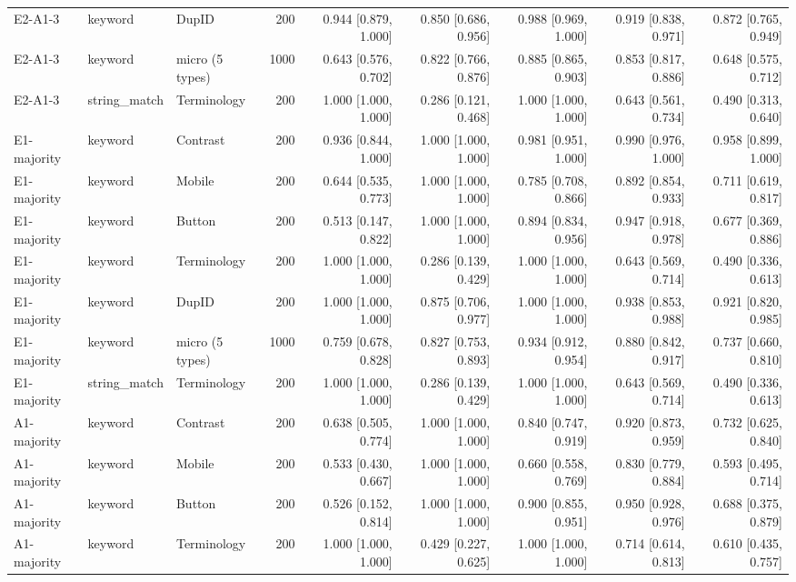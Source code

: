 \begin{table}[t]
\begin{tabular}{lllrrrrrr}
E2-A1-3 & keyword & DupID & 200 & 0.944 [0.879, 1.000] & 0.850 [0.686, 0.956] & 0.988 [0.969, 1.000] & 0.919 [0.838, 0.971] & 0.872 [0.765, 0.949] \\
E2-A1-3 & keyword & micro (5 types) & 1000 & 0.643 [0.576, 0.702] & 0.822 [0.766, 0.876] & 0.885 [0.865, 0.903] & 0.853 [0.817, 0.886] & 0.648 [0.575, 0.712] \\
E2-A1-3 & string\_match & Terminology & 200 & 1.000 [1.000, 1.000] & 0.286 [0.121, 0.468] & 1.000 [1.000, 1.000] & 0.643 [0.561, 0.734] & 0.490 [0.313, 0.640] \\
E1-majority & keyword & Contrast & 200 & 0.936 [0.844, 1.000] & 1.000 [1.000, 1.000] & 0.981 [0.951, 1.000] & 0.990 [0.976, 1.000] & 0.958 [0.899, 1.000] \\
E1-majority & keyword & Mobile & 200 & 0.644 [0.535, 0.773] & 1.000 [1.000, 1.000] & 0.785 [0.708, 0.866] & 0.892 [0.854, 0.933] & 0.711 [0.619, 0.817] \\
E1-majority & keyword & Button & 200 & 0.513 [0.147, 0.822] & 1.000 [1.000, 1.000] & 0.894 [0.834, 0.956] & 0.947 [0.918, 0.978] & 0.677 [0.369, 0.886] \\
E1-majority & keyword & Terminology & 200 & 1.000 [1.000, 1.000] & 0.286 [0.139, 0.429] & 1.000 [1.000, 1.000] & 0.643 [0.569, 0.714] & 0.490 [0.336, 0.613] \\
E1-majority & keyword & DupID & 200 & 1.000 [1.000, 1.000] & 0.875 [0.706, 0.977] & 1.000 [1.000, 1.000] & 0.938 [0.853, 0.988] & 0.921 [0.820, 0.985] \\
E1-majority & keyword & micro (5 types) & 1000 & 0.759 [0.678, 0.828] & 0.827 [0.753, 0.893] & 0.934 [0.912, 0.954] & 0.880 [0.842, 0.917] & 0.737 [0.660, 0.810] \\
E1-majority & string\_match & Terminology & 200 & 1.000 [1.000, 1.000] & 0.286 [0.139, 0.429] & 1.000 [1.000, 1.000] & 0.643 [0.569, 0.714] & 0.490 [0.336, 0.613] \\
A1-majority & keyword & Contrast & 200 & 0.638 [0.505, 0.774] & 1.000 [1.000, 1.000] & 0.840 [0.747, 0.919] & 0.920 [0.873, 0.959] & 0.732 [0.625, 0.840] \\
A1-majority & keyword & Mobile & 200 & 0.533 [0.430, 0.667] & 1.000 [1.000, 1.000] & 0.660 [0.558, 0.769] & 0.830 [0.779, 0.884] & 0.593 [0.495, 0.714] \\
A1-majority & keyword & Button & 200 & 0.526 [0.152, 0.814] & 1.000 [1.000, 1.000] & 0.900 [0.855, 0.951] & 0.950 [0.928, 0.976] & 0.688 [0.375, 0.879] \\
A1-majority & keyword & Terminology & 200 & 1.000 [1.000, 1.000] & 0.429 [0.227, 0.625] & 1.000 [1.000, 1.000] & 0.714 [0.614, 0.813] & 0.610 [0.435, 0.757] \\

\end{tabular}
\end{table}
